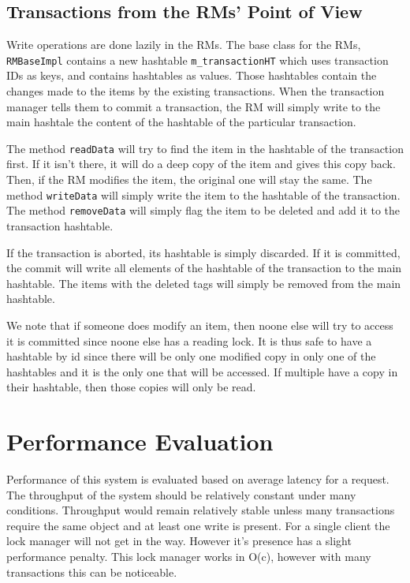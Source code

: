 \documentclass[12pt]{article}
\theoremstyle{plain}%
\theoremstyle{definition}
\theoremstyle{remark}
\newcommand{\java}[1]{{\lstinline!#1!}}
\begin{document}
\subsection*{Transactions from the RMs' Point of View}

Write operations are done lazily in the RMs. The base class for the RMs, \java{RMBaseImpl} contains a new hashtable \java{m_transactionHT} which uses transaction IDs as keys, and contains hashtables as values. Those hashtables contain the changes made to the items by the existing transactions. When the transaction manager tells them to commit a transaction, the RM will simply write to the main hashtale the content of the hashtable of the particular transaction.

The method \java{readData} will try to find the item in the hashtable of the transaction first. If it isn't there, it will do a deep copy of the item and gives this copy back. Then, if the RM modifies the item, the original one will stay the same. The method \java{writeData} will simply write the item to the hashtable of the transaction. The method \java{removeData} will simply flag the item to be deleted and add it to the transaction hashtable.

If the transaction is aborted, its hashtable is simply discarded. If it is committed, the commit will write all elements of the hashtable of the transaction to the main hashtable. The items with the deleted tags will simply be removed from the main hashtable.

We note that if someone does modify an item, then noone else will try to access it is committed since noone else has a reading lock. It is thus safe to have a hashtable by id since there will be only one modified copy in only one of the hashtables and it is the only one that will be accessed. If multiple have a copy in their hashtable, then those copies will only be read.

\section*{Performance Evaluation}
Performance of this system is evaluated based on average latency for a request. The throughput of the system should be relatively constant under many conditions. Throughput would remain relatively stable unless many transactions require the same object and at least one write is present. For a single client the lock manager will not get in the way. However it's presence has a slight performance penalty. This lock manager works in O(c), however with many transactions this can be noticeable. 
\end{document}
